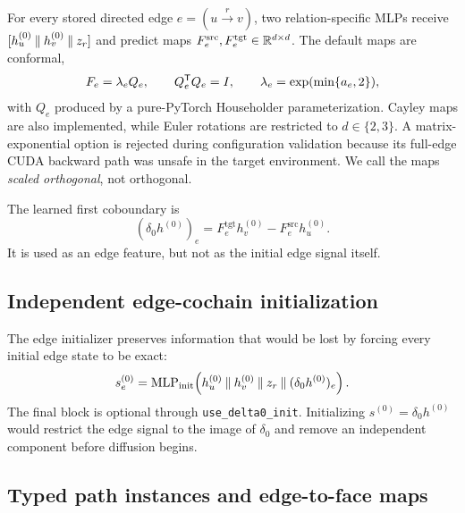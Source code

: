For every stored directed edge $e=(u\xrightarrow{r}v)$, two relation-specific MLPs receive
$[h_u^{(0)}\mathbin\Vert h_v^{(0)}\mathbin\Vert z_r]$ and predict maps
$F_e^{\mathrm{src}},F_e^{\mathrm{tgt}}\in\mathbb{R}^{d\times d}$. The default maps are conformal,
\begin{equation}
  F_e=\lambda_e Q_e,\qquad Q_e^{\mathsf{T}}Q_e=I,\qquad
  \lambda_e=\exp(\min\{a_e,2\}),
  \label{eq:conformal-map}
\end{equation}
with $Q_e$ produced by a pure-PyTorch Householder parameterization. Cayley maps are also
implemented, while Euler rotations are restricted to $d\in\{2,3\}$. A matrix-exponential option
is rejected during configuration validation because its full-edge CUDA backward path was unsafe in
the target environment. We call the maps \emph{scaled orthogonal}, not orthogonal.

The learned first coboundary is
\begin{equation}
  (\delta_0 h^{(0)})_e=F_e^{\mathrm{tgt}}h_v^{(0)}-
  F_e^{\mathrm{src}}h_u^{(0)}.
  \label{eq:delta0}
\end{equation}
It is used as an edge feature, but not as the initial edge signal itself.

\subsection{Independent edge-cochain initialization}

The edge initializer preserves information that would be lost by forcing every initial edge state
to be exact:
\begin{equation}
  s_e^{(0)}=\operatorname{MLP}_{\mathrm{init}}\!\left(
  h_u^{(0)}\mathbin\Vert h_v^{(0)}\mathbin\Vert z_r\mathbin\Vert(\delta_0h^{(0)})_e
  \right).
  \label{eq:edge-init}
\end{equation}
The final block is optional through \texttt{use\_delta0\_init}. Initializing
$s^{(0)}=\delta_0h^{(0)}$ would restrict the edge signal to the image of $\delta_0$ and remove an
independent component before diffusion begins.

\subsection{Typed path instances and edge-to-face maps}

